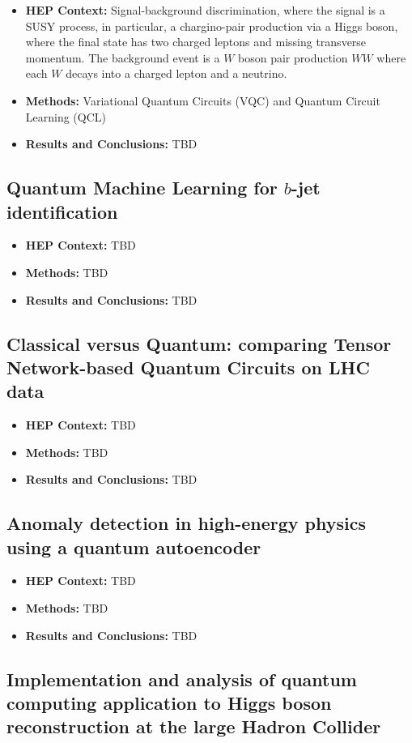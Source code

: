 \begin{itemize}
	\item \textbf{HEP Context: }Signal-background discrimination, where the signal is a SUSY process, in particular, a chargino-pair production via a Higgs boson, where the final state has two charged leptons and missing transverse momentum. The background event is a $W$ boson pair production $WW$ where each $W$ decays into a charged lepton and a neutrino.
	\item \textbf{Methods: }Variational Quantum Circuits (VQC) and Quantum Circuit Learning (QCL)
	\item \textbf{Results and Conclusions: }TBD
\end{itemize}\subsection{Quantum Machine Learning for $b$-jet identification~\cite{Gianelle:2022unu}}
\begin{itemize}
	\item \textbf{HEP Context: }TBD
	\item \textbf{Methods: }TBD
	\item \textbf{Results and Conclusions: }TBD
\end{itemize}\subsection{Classical versus Quantum: comparing Tensor Network-based Quantum Circuits on LHC data~\cite{Araz:2022haf}}
\begin{itemize}
	\item \textbf{HEP Context: }TBD
	\item \textbf{Methods: }TBD
	\item \textbf{Results and Conclusions: }TBD
\end{itemize}\subsection{Anomaly detection in high-energy physics using a quantum autoencoder~\cite{Ngairangbam:2021yma}}
\begin{itemize}
	\item \textbf{HEP Context: }TBD
	\item \textbf{Methods: }TBD
	\item \textbf{Results and Conclusions: }TBD
\end{itemize}\subsection{Implementation and analysis of quantum computing application to Higgs boson reconstruction at the large Hadron Collider~\cite{AlexiadesArmenakas:2021lrs}}
